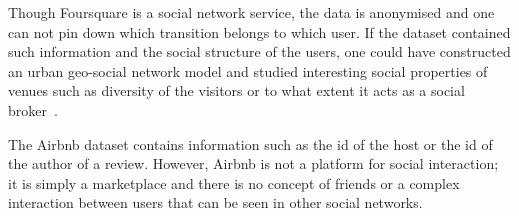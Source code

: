 Though Foursquare is a social network service, the data is anonymised and one can not pin down which transition belongs to which user. If the dataset contained such information and the social structure of the users, one could have constructed an urban geo-social network model and studied interesting social properties of venues such as diversity of the visitors or to what extent it acts as a social broker~\citep{hristova2016measuring}.

The Airbnb dataset contains information such as the id of the host or the id of the author of a review. However, Airbnb is not a platform for social interaction; it is simply a marketplace and there is no concept of friends or a complex interaction between users that can be seen in other social networks.